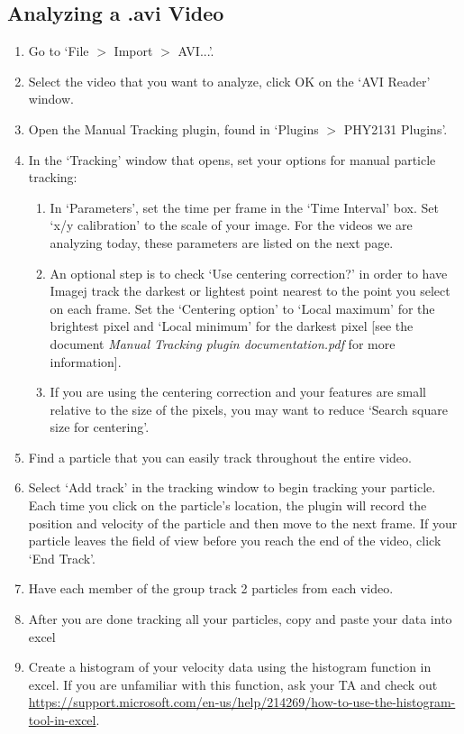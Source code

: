 \subsection{Analyzing a .avi Video}
\begin{enumerate}
\item Go to `File $>$ Import $>$ AVI...'.
\item Select the video that you want to analyze, click OK on the `AVI Reader' window.
\item Open the Manual Tracking plugin, found in `Plugins $>$ PHY2131 Plugins'.
\item In the `Tracking' window that opens, set your options for manual particle tracking:
	\begin{enumerate}
	\item In `Parameters', set the time per frame in the `Time Interval' box. Set `x/y calibration' to the scale of your image. For the videos we are analyzing today, these parameters are listed on the next page.
	\item An optional step is to check `Use centering correction?' in order to have Imagej track the darkest or lightest point nearest to the point you select on each frame. Set the `Centering option' to `Local maximum' for the brightest pixel and `Local minimum' for the darkest pixel [see the document \textit{Manual Tracking plugin documentation.pdf} for more information].
	\item If you are using the centering correction and your features are small relative to the size of the pixels, you may want to reduce `Search square size for centering'.
	\end{enumerate}
\item Find a particle that you can easily track throughout the entire video.
\item Select `Add track' in the tracking window to begin tracking your particle. Each time you click on the particle's location, the plugin will record the position and velocity of the particle and then move to the next frame. If your particle leaves the field of view before you reach the end of the video, click `End Track'.
\item Have each member of the group track 2 particles from each video.
\item After you are done tracking all your particles, copy and paste your data into excel
\item Create a histogram of your velocity data using the histogram function in excel. If you are unfamiliar with this function, ask your TA and check out \url{https://support.microsoft.com/en-us/help/214269/how-to-use-the-histogram-tool-in-excel}.
\end{enumerate}

